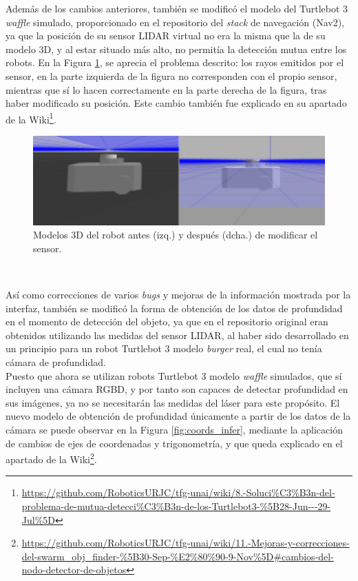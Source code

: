 Además de los cambios anteriores, también se modificó el modelo del Turtlebot 3
\textit{waffle} simulado, proporcionado en el repositorio del \textit{stack} de
navegación (Nav2), ya que la posición de su sensor LIDAR virtual no era la misma
que la de su modelo 3D, y al estar situado más alto, no permitía la detección
mutua entre los robots.
En la Figura \ref{fig:mutua_deteccion}, se aprecia el problema descrito: los
rayos emitidos por el sensor, en la parte izquierda de la figura no corresponden
con el propio sensor, mientras que sí lo hacen correctamente en la parte derecha
de la figura, tras haber modificado su posición.
Este cambio también fue explicado en su apartado de la Wiki\footnote{
\url{https://github.com/RoboticsURJC/tfg-unai/wiki/8.-Soluci\%C3\%B3n-del-problema-de-mutua-detecci\%C3\%B3n-de-los-Turtlebot3-\%5B28-Jun---29-Jul\%5D}}.

\begin{figure} [h!]
  \begin{center}
    \includegraphics[width=12cm]{figs/turtlebot_model_mods}
  \end{center}
  \caption{Modelos 3D del robot antes (izq.) y después (dcha.) de modificar el sensor.}
  \label{fig:mutua_deteccion}
\end{figure}\

Así como correcciones de varios \textit{bugs} y mejoras de la información
mostrada por la interfaz, también se modificó la forma de obtención de los datos
de profundidad en el momento de detección del objeto, ya que en el repositorio
original eran obtenidos utilizando las medidas del sensor LIDAR, al haber sido
desarrollado en un principio para un robot Turtlebot 3 modelo \textit{burger}
real, el cual no tenía cámara de profundidad.
\\

Puesto que ahora se utilizan robots Turtlebot 3 modelo \textit{waffle}
simulados, que sí incluyen una cámara RGBD, y por tanto son capaces de detectar
profundidad en sus imágenes, ya no se necesitarán las medidas del láser para
este propósito.
El nuevo modelo de obtención de profundidad únicamente a partir de los datos de
la cámara se puede observar en la Figura \ref{fig:coords_infer}, mediante la
aplicación de cambios de ejes de coordenadas y trigonometría, y que queda
explicado en el apartado de la Wiki\footnote{
\url{https://github.com/RoboticsURJC/tfg-unai/wiki/11.-Mejoras-y-correcciones-del-swarm\_obj\_finder-\%5B30-Sep-\%E2\%80\%90-9-Nov\%5D\#cambios-del-nodo-detector-de-objetos}}.
\\

